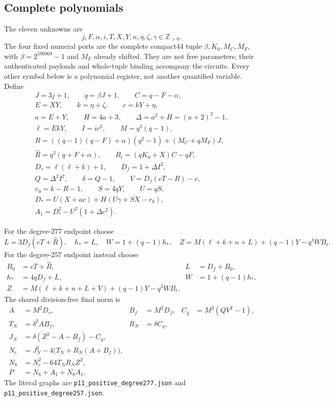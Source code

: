 \subsection{Complete polynomials}

The eleven unknowns are
\[
 j,F,\alpha,i,T,X,Y,n,\eta,\zeta,\gamma\in\mathbb Z_{>0}.
\]
The four fixed numeral ports are the complete compact44 tuple
$\beta,K_0,M_C,M_F$, with $\beta=2^{590069}-1$ and $M_F$ already
shifted.  They are not free parameters; their authenticated payloads and
whole-tuple binding accompany the circuits.  Every other symbol below is
a polynomial register, not another quantified variable.  Define
\begin{gather*}
 J=3j+1,\qquad q=\beta J+1,\qquad C=q-F-\alpha,\\
 E=XY,\qquad k=\eta+\zeta,\qquad c=kY+\eta,\\
 a=E+Y,\qquad H=4a+3,\qquad \Delta=a^2+H=(a+2)^2-1,\\
 \ell=EkY,\qquad I=ic^2,\qquad M=q^3(q-1),\\
 R=((q-1)(q-F)+\alpha)(q^2-1)+(M_C+qM_F)J,\\
 \widehat R=q^3(q+F+\alpha),\qquad B_t=(qK_0+X)C-qF,\\
 D_\tau=\ell(\ell+k)+1,\qquad D_f=1+\Delta I^2,\\
 Q=\Delta^2I^2,\qquad \delta=Q-1,\qquad V=D_f(cT-R)-c,\\
 r_0=k-R-1,\qquad S=4qY,\qquad U=qS,\\
 D_*=U(X+ac)+H(U\gamma+SX-r_0),\\
 A_1=D_*^2-U^2(1+\Delta c^2).
\end{gather*}

For the degree-$277$ endpoint choose
\[
 L=3D_f(cT+\widehat R),\quad h_*=L,\quad
 W=1+(q-1)h_*,\quad
 Z=M(\ell+k+n+L)+(q-1)Y-q^3WB_t.
\]
For the degree-$257$ endpoint instead choose
\begin{align*}
 B_0&=cT+\widehat R,&L&=D_f+B_0,\\
 h_*&=4qD_f+L,&W&=1+(q-1)h_*,\\
 Z&=M(\ell+k+n+L+V)+(q-1)Y-q^3WB_t.
\end{align*}
The shared division-free final norm is
\begin{align*}
 A&=M^2D_\tau,&B_f&=M^2D_f,&C_y&=M^2(QV^2-1),\\
 T_N&=\delta^2AB_f,&R_N&=\delta C_y,\\
 J_N&=\delta(Z^2-A-B_f)-C_y,\\
 N_c&=J_N^2-4\bigl(T_N+R_N(A+B_f)\bigr),\\
 N_8&=N_c^2-64T_NR_NZ^2,\\
 P&=N_8+A_1+N_8A_1.
\end{align*}
The literal graphs are \texttt{p11\_positive\_degree277.json} and
\texttt{p11\_positive\_degree257.json}.

